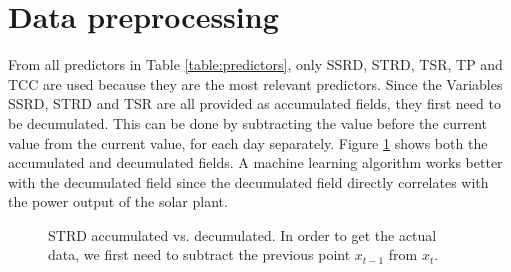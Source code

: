 \section{Data preprocessing}
\label{sec:data-preprocessing}

From all predictors in Table \ref{table:predictors}, only SSRD, STRD, TSR, TP and TCC are used 
because they are the most relevant predictors. 
Since the Variables SSRD, STRD and TSR are all provided as accumulated fields, they first need to be decumulated.
This can be done by subtracting the value before the current value from the current value, for each day separately. 
Figure \ref{fig:strd-accumulated-vs-decumulated} shows both the accumulated and decumulated fields. 
A machine learning algorithm works better with the decumulated field since the decumulated field directly correlates 
with the power output of the solar plant.

\begin{figure}[h]%
    \centering
    \qquad
    \caption[STRD accumulated vs. decumulated]{STRD accumulated vs. decumulated. 
    In order to get the actual data, we first need to subtract the previous point \(x_{t-1}\) from \(x_t\).}%
    \label{fig:strd-accumulated-vs-decumulated}%
\end{figure}